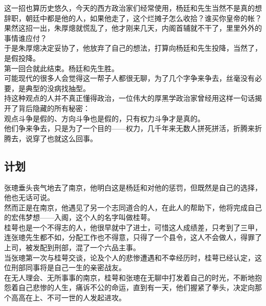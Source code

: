 \begin{multicols}{\theparacolNo}
这一招也算历史悠久，今天的西方政治家们经常使用，杨廷和先生当然不是真的想辞职，朝廷中都是他的人，如果他走了，这个烂摊子怎么收拾？谁买你皇帝的帐？\\

果然这招一出，朱厚熜就慌乱了，他才刚来几天，内阁首辅就不干了，里里外外的事情谁应付？\\

于是朱厚熜决定妥协了，他放弃了自己的想法，打算向杨廷和先生投降，当然了，是假投降。\\

第一回合就此结束。杨廷和先生胜。\\

可能现代的很多人会觉得这一帮子人都很无聊，为了几个字争来争去，丝毫没有必要，是典型的没病找抽型。\\

持这种观点的人并不真正懂得政治，一位伟大的厚黑学政治家曾经用这样一句话揭开了背后隐藏的所有秘密：\\

观点斗争是假的、方向斗争也是假的，只有权力斗争才是真的。\\

他们争来争去，只是为了一个目的——权力，几千年来无数人拼死拼活，折腾来折腾去，说穿了也就这么回事。\\

\subsection{计划}
张璁垂头丧气地去了南京，他明白这是杨廷和对他的惩罚，但既然是自己的选择，他也无话可说。\\

然而正是在南京，他遇见了另一个志同道合的人，在此人的帮助下，他将完成自己的宏伟梦想——入阁，这个人的名字叫做桂萼。\\

桂萼也是一个不得志的人，他很早就中了进士，可惜这人成绩差，只考到了三甲，连张璁先生都不如，分配工作也不得意，只得了一个县令，这人不会做人，得罪了上司，被发配到刑部，混了一个六品主事。\\

当张璁第一次与桂萼交谈，论及个人的悲惨遭遇和不幸经历时，桂萼已经认定，这位刑部同事将是自己一生的亲密战友。\\

在无人理会、无所事事的南京，桂萼和张璁在无聊中打发着自己的时光，不断地抱怨着自己悲惨的人生，痛诉不公的命运，直到有一天，他们握紧了拳头，决定向那个高高在上、不可一世的人发起进攻。\\


\end{multicols}
